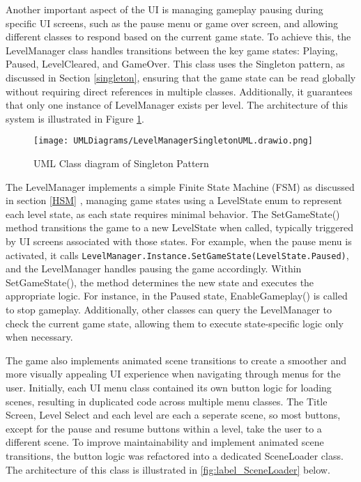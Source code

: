 \documentclass[10pt]{final_report}
\begin{document}
Another important aspect of the UI is managing gameplay pausing during specific UI screens, such as the pause menu or game over screen, and allowing different classes to respond based on the current game state. To achieve this, the LevelManager class handles transitions between the key game states: Playing, Paused, LevelCleared, and GameOver.
This class uses the Singleton pattern, as discussed in Section \ref{singleton}, ensuring that the game state can be read globally without requiring direct references in multiple classes. Additionally, it guarantees that only one instance of LevelManager exists per level. The architecture of this system is illustrated in Figure \ref{fig:label_singletonLevelManager}.

\begin{figure}[H]
    \centering
    \texttt{[image: UMLDiagrams/LevelManagerSingletonUML.drawio.png]}
    \caption{UML Class diagram of Singleton Pattern}
    \label{fig:label_singletonLevelManager}
\end{figure}

The LevelManager implements a simple Finite State Machine (FSM) as discussed in section \ref{HSM} , managing game states using a LevelState enum to represent each level state, as each state requires minimal behavior. The SetGameState() method transitions the game to a new LevelState when called, typically triggered by UI screens associated with those states. For example, when the pause menu is activated, it calls \newline \texttt{LevelManager.Instance.SetGameState(LevelState.Paused)}, and the LevelManager handles pausing the game accordingly. Within SetGameState(), the method determines the new state and executes the appropriate logic. For instance, in the Paused state, EnableGameplay() is called to stop gameplay. Additionally, other classes can query the LevelManager to check the current game state, allowing them to execute state-specific logic only when necessary.\newline

The game also implements animated scene transitions to create a smoother and more visually appealing UI experience when navigating through menus for the user. Initially, each UI menu class contained its own button logic for loading scenes, resulting in duplicated code across multiple menu classes. The Title Screen, Level Select and each level are each a seperate scene, so most buttons, except for the pause and resume buttons within a level, take the user to a different scene. To improve maintainability and implement animated scene transitions, the button logic was refactored into a dedicated SceneLoader class. The architecture of this class is illustrated in \ref{fig:label_SceneLoader} below.
\end{document}
